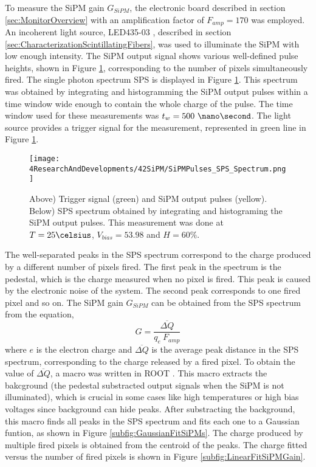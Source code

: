 To measure the SiPM gain $G_{SiPM}$, the electronic board described in section \ref{sec:MonitorOverview} with an amplification factor of $F_{amp}=170$ was employed. An incoherent light source, LED435-03 \cite{LEDRLT}, described in section \ref{sec:CharacterizationScintillatingFibers}, was used to illuminate the SiPM with low enough intensity. The SiPM output signal shows various well-defined pulse heights, shown in Figure \ref{fig:OutputPulses_SPSspectrum}, corresponding to the number of pixels simultaneously fired. The single photon spectrum SPS is displayed in Figure \ref{fig:OutputPulses_SPSspectrum}. This spectrum was obtained by integrating and histogramming the SiPM output pulses within a time window wide enough to contain the whole charge of the pulse. The time window used for these measurements was $t_w= 500~\nano\second$. The light source provides a trigger signal for the measurement, represented in green line in Figure \ref{fig:OutputPulses_SPSspectrum}.
\begin{figure}[hbtp]
\centering
\texttt{[image: 4ResearchAndDevelopments/42SiPM/SiPMPulses\_SPS\_Spectrum.png]}
\caption{Above) Trigger signal (green) and SiPM output pulses (yellow). Below) SPS spectrum obtained by integrating and histograming the SiPM output pulses. This measurement was done at $T=25\celsius$, $V_{bias}=53.98$ and $H=60\%$. \label{fig:OutputPulses_SPSspectrum}}
\end{figure}
The well-separated peaks in the SPS spectrum correspond to the charge produced by a different number of pixels fired. The first peak in the spectrum is the pedestal, which is the charge measured when no pixel is fired. This peak is caused by the electronic noise of the system. The second peak corresponds to one fired pixel and so on. The SiPM gain $G_{SiPM}$ can be obtained from the SPS spectrum from the equation,
\begin{equation}
G=\frac{\overline{\Delta Q}}{q_e \: F_{amp}}
\label{SiPMGain}
\end{equation}
where $e$ is the electron charge and $\overline{\Delta Q}$ is the average peak distance in the SPS spectrum, corresponding to the charge released by a fired pixel. To obtain the value of $\overline{\Delta Q}$, a macro was written in ROOT \cite{ROOTWebPage, ROOTWebPage2}. This macro extracts the bakcground (the pedestal substracted output signals when the SiPM is not illuminated), which is crucial in some cases like high temperatures or high bias voltages since background can hide peaks. After substracting the background, this macro finds all peaks in the SPS spectrum and fits each one to a Gaussian funtion, as shown in Figure \ref{subfig:GaussianFitSiPMs}. The charge produced by multiple fired pixels is obtained from the centroid of the peaks. The charge fitted versus the number of fired pixels is shown in Figure \ref{subfig:LinearFitSiPMGain}.

